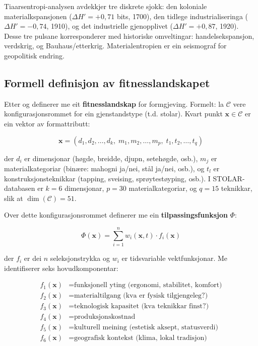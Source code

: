 \documentclass[10pt, a4paper, twocolumn]{article}
\begin{document}
Tiaarsentropi-analysen avdekkjer tre diskrete sjokk: den koloniale materialkspansjonen ($\Delta H' = +0{,}71$ bits, 1700), den tidlege industrialiseringa ($\Delta H' = -0{,}74$, 1910), og det industrielle gjenopplivet ($\Delta H' = +0{,}87$, 1920). Desse tre pulsane korresponderer med historiske omveltingar: handelsekspansjon, verdskrig, og Bauhaus/etterkrig. Materialentropien er ein seismograf for geopolitisk endring.

\subsection{Formell definisjon av fitnesslandskapet}

Etter \citet{wright1932} og \citet{kauffman1993} definerer me eit \textbf{fitnesslandskap} for formgjeving. Formelt: la $\mathcal{C}$ vere konfigurasjonsrommet for ein gjenstandstype (t.d. stolar). Kvart punkt $\mathbf{x} \in \mathcal{C}$ er ein vektor av formattributt:

\begin{equation}
  \mathbf{x} = (d_1, d_2, \ldots, d_k, \; m_1, m_2, \ldots, m_p, \; t_1, t_2, \ldots, t_q)
\end{equation}

\noindent der $d_i$ er dimensjonar (høgde, breidde, djupn, setehøgde, osb.), $m_j$ er materialkategoriar (binære: mahogni ja/nei, stål ja/nei, osb.), og $t_l$ er konstruksjonsteknikkar (tapping, sveising, sprøytestøyping, osb.). I STOLAR-databasen er $k = 6$ dimensjonar, $p = 30$ materialkategoriar, og $q = 15$ teknikkar, slik at $\dim(\mathcal{C}) = 51$.

Over dette konfigurasjonsrommet definerer me ein \textbf{tilpassingsfunksjon} $\Phi$:

\begin{equation}
  \Phi(\mathbf{x}) = \sum_{i=1}^{n} w_i(\mathbf{x}, t) \cdot f_i(\mathbf{x})
\end{equation}

\noindent der $f_i$ er dei $n$ seleksjonstrykka og $w_i$ er tidsvariable vektfunksjonar. Me identifiserer seks hovudkomponentar:

\begin{align}
  f_1(\mathbf{x}) &= \text{funksjonell yting (ergonomi, stabilitet, komfort)} \\
  f_2(\mathbf{x}) &= \text{materialtilgang (kva er fysisk tilgjengeleg?)} \\
  f_3(\mathbf{x}) &= \text{teknologisk kapasitet (kva teknikkar finst?)} \\
  f_4(\mathbf{x}) &= \text{produksjonskostnad} \\
  f_5(\mathbf{x}) &= \text{kulturell meining (estetisk aksept, statusverdi)} \\
  f_6(\mathbf{x}) &= \text{geografisk kontekst (klima, lokal tradisjon)}
\end{align}
\end{document}

